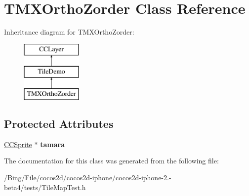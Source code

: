 \hypertarget{interface_t_m_x_ortho_zorder}{\section{T\-M\-X\-Ortho\-Zorder Class Reference}
\label{interface_t_m_x_ortho_zorder}
}
Inheritance diagram for T\-M\-X\-Ortho\-Zorder\-:\begin{figure}[H]
\begin{center}
\leavevmode
\includegraphics[height=3.000000cm]{interface_t_m_x_ortho_zorder}
\end{center}
\end{figure}
\subsection*{Protected Attributes}
\begin{DoxyCompactItemize}
\item 
\hypertarget{interface_t_m_x_ortho_zorder_adc7e37335bae29819aa53945b732cd09}{\hyperlink{class_c_c_sprite}{C\-C\-Sprite} $\ast$ {\bfseries tamara}}\label{interface_t_m_x_ortho_zorder_adc7e37335bae29819aa53945b732cd09}

\end{DoxyCompactItemize}


The documentation for this class was generated from the following file\-:\begin{DoxyCompactItemize}
\item 
/\-Bing/\-File/cocos2d/cocos2d-\/iphone/cocos2d-\/iphone-\/2.-\/beta4/tests/Tile\-Map\-Test.\-h\end{DoxyCompactItemize}
